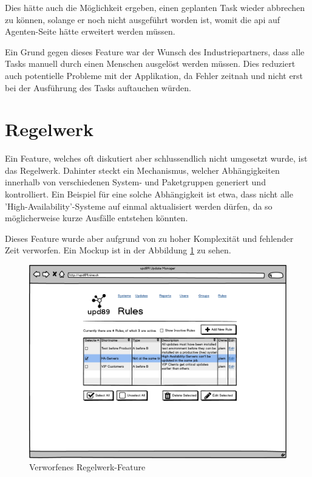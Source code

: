 Dies hätte auch die Möglichkeit ergeben, einen geplanten Task wieder abbrechen zu können, solange er noch nicht ausgeführt worden ist, womit die \gls{api} auf Agenten-Seite hätte erweitert werden müssen.

Ein Grund gegen dieses Feature war der Wunsch des Industriepartners, dass alle Tasks manuell durch einen Menschen ausgelöst werden müssen. Dies reduziert auch potentielle Probleme mit der Applikation, da Fehler zeitnah und nicht erst bei der Ausführung des Tasks auftauchen würden.

\section{Regelwerk} \label{sec:ausblick:regelwerk}

Ein Feature, welches oft diskutiert aber schlussendlich nicht umgesetzt wurde, ist das Regelwerk. Dahinter steckt ein Mechanismus, welcher Abhängigkeiten innerhalb von verschiedenen System- und Paketgruppen generiert und kontrolliert. Ein Beispiel für eine solche Abhängigkeit ist etwa, dass nicht alle 'High-Availability'-Systeme auf einmal aktualisiert werden dürfen, da so möglicherweise kurze Ausfälle entstehen könnten. 

Dieses Feature wurde aber aufgrund von zu hoher Komplexität und fehlender Zeit verworfen. Ein Mockup ist in der Abbildung \ref{fig:ergebnis:rules} zu sehen.

\begin{figure}[H]
	\centering
	\includegraphics[width=\linewidth]{files/mockups/rules}
	\caption{Verworfenes Regelwerk-Feature}
	\label{fig:ergebnis:rules}
\end{figure}
